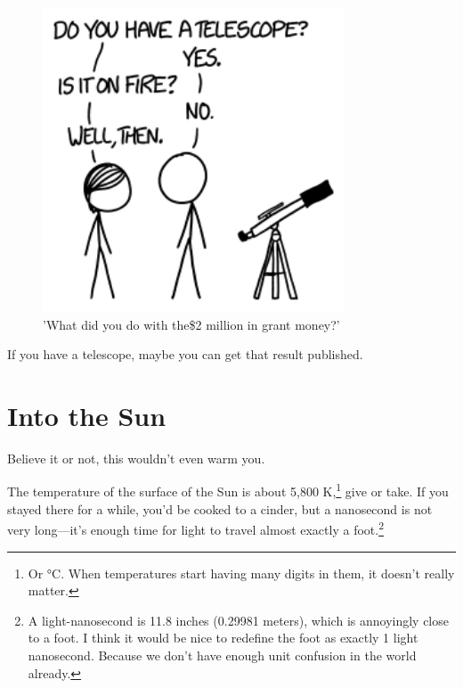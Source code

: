 {\begin{figure}[!htbp]
\centering
\includegraphics[scale=0.5, max width=0.8\textwidth]{imgs/a/114/telescope.png}
\caption{'What did you do with the\$2 million in grant money?'}
\end{figure}

{If you have a telescope, maybe you can get that result published.}

{
\chapter{Into the Sun}
}

\hfill{}

{Believe it or not, this wouldn't even warm you.}

{The temperature of the surface of the Sun is about 5,800 K,{\footnote{Or °C. When temperatures start having many digits in them, it doesn't really matter.} } give or take. If you stayed there for a while, you'd be cooked to a cinder, but a nanosecond is not very long—it's enough time for light to travel almost exactly a foot.{\footnote{A light-nanosecond is 11.8 inches (0.29981 meters), which is annoyingly close to a foot. I think it would be nice to redefine the foot as exactly 1 light nanosecond. Because we don't have enough unit confusion in the world already.

}}}}
